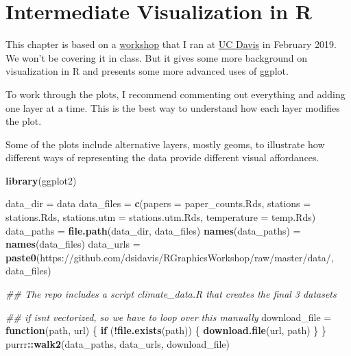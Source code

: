 \documentclass[
]{article}
\newenvironment{Shaded}{\begin{snugshade}}{\end{snugshade}}
\newcommand{\CommentTok}[1]{\textcolor[rgb]{0.56,0.35,0.01}{\textit{#1}}}
\newcommand{\ControlFlowTok}[1]{\textcolor[rgb]{0.13,0.29,0.53}{\textbf{#1}}}
\newcommand{\KeywordTok}[1]{\textcolor[rgb]{0.13,0.29,0.53}{\textbf{#1}}}
\newcommand{\NormalTok}[1]{#1}
\newcommand{\OperatorTok}[1]{\textcolor[rgb]{0.81,0.36,0.00}{\textbf{#1}}}
\newcommand{\StringTok}[1]{\textcolor[rgb]{0.31,0.60,0.02}{#1}}
\begin{document}
\hypertarget{intermediate-visualization-in-r}{%
\section{Intermediate Visualization in R}\label{intermediate-visualization-in-r}}

This chapter is based on a \href{https://github.com/dsidavis/RGraphicsWorkshop}{workshop} that I ran at \href{https://www.youtube.com/watch?v=grEmJSL4Lwc}{UC Davis} in February 2019. We won't be covering it in class. But it gives some more background on visualization in R and presents some more advanced uses of ggplot.

To work through the plots, I recommend commenting out everything and adding one layer at a time. This is the best way to understand how each layer modifies the plot.

Some of the plots include alternative layers, mostly geoms, to illustrate how different ways of representing the data provide different visual affordances.

\begin{Shaded}
\begin{Highlighting}[]
\KeywordTok{library}\NormalTok{(ggplot2)}

\NormalTok{data\_dir =}\StringTok{ \textquotesingle{}data\textquotesingle{}}
\NormalTok{data\_files =}\StringTok{ }\KeywordTok{c}\NormalTok{(}\StringTok{\textquotesingle{}papers\textquotesingle{}}\NormalTok{ =}\StringTok{ \textquotesingle{}paper\_counts.Rds\textquotesingle{}}\NormalTok{, }
               \StringTok{\textquotesingle{}stations\textquotesingle{}}\NormalTok{ =}\StringTok{ \textquotesingle{}stations.Rds\textquotesingle{}}\NormalTok{, }
               \StringTok{\textquotesingle{}stations.utm\textquotesingle{}}\NormalTok{ =}\StringTok{ \textquotesingle{}stations.utm.Rds\textquotesingle{}}\NormalTok{, }
               \StringTok{\textquotesingle{}temperature\textquotesingle{}}\NormalTok{ =}\StringTok{ \textquotesingle{}temp.Rds\textquotesingle{}}\NormalTok{)}
\NormalTok{data\_paths =}\StringTok{ }\KeywordTok{file.path}\NormalTok{(data\_dir, data\_files)}
\KeywordTok{names}\NormalTok{(data\_paths) =}\StringTok{ }\KeywordTok{names}\NormalTok{(data\_files)}
\NormalTok{data\_urls =}\StringTok{ }\KeywordTok{paste0}\NormalTok{(}\StringTok{\textquotesingle{}https://github.com/dsidavis/RGraphicsWorkshop/raw/master/data/\textquotesingle{}}\NormalTok{, data\_files)}

\CommentTok{\#\# The repo includes a script \textasciigrave{}climate\_data.R\textasciigrave{} that creates the final 3 datasets}

\CommentTok{\#\# \textasciigrave{}if\textasciigrave{} isn\textquotesingle{}t vectorized, so we have to loop over this manually}
\NormalTok{download\_file =}\StringTok{ }\ControlFlowTok{function}\NormalTok{(path, url) \{}
    \ControlFlowTok{if}\NormalTok{ (}\OperatorTok{!}\KeywordTok{file.exists}\NormalTok{(path)) \{}
        \KeywordTok{download.file}\NormalTok{(url, path)}
\NormalTok{    \}}
\NormalTok{\}}
\NormalTok{purrr}\OperatorTok{::}\KeywordTok{walk2}\NormalTok{(data\_paths, data\_urls, download\_file)}
\end{Highlighting}
\end{Shaded}
\end{document}

